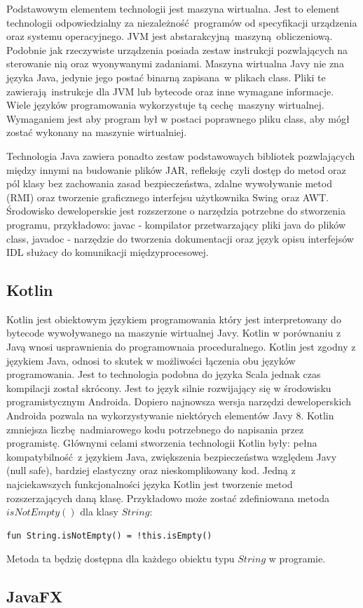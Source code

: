 Podstawowym elementem technologii jest maszyna wirtualna. Jest to element technologii odpowiedzialny za niezależność programów od specyfikacji urządzenia oraz systemu operacyjnego. JVM jest abstarakcyjną maszyną obliczeniową. Podobnie jak rzeczywiste urządzenia posiada zestaw instrukcji pozwlających na sterowanie nią oraz wyonywanymi zadaniami. Maszyna wirtualna Javy nie zna języka Java, jedynie jego postać binarną zapisana w plikach class. Pliki te zawierają instrukcje dla JVM lub bytecode oraz inne wymagane informacje. Wiele języków programowania wykorzystuje tą cechę maszyny wirtualnej. Wymaganiem jest aby program był w postaci poprawnego pliku class, aby mógł zostać wykonany na maszynie wirtualniej.

Technologia Java zawiera ponadto zestaw podstawowaych bibliotek pozwlających między innymi na budowanie plików JAR, refleksję czyli dostęp do metod oraz pól klasy bez zachowania zasad bezpieczeństwa, zdalne wywoływanie metod (RMI) oraz tworzenie graficznego interfejsu użytkownika Swing oraz AWT. Środowisko deweloperskie jest rozszerzone o narzędzia potrzebne do stworzenia programu, przykładowo: javac - kompilator przetwarzający pliki java do plików class, javadoc - narzędzie do tworzenia dokumentacji oraz język opisu interfejsów IDL służacy do komunikacji międzyprocesowej.
\subsection{Kotlin}
Kotlin jest obiektowym językiem programowania który jest interpretowany do bytecode wywoływanego na maszynie wirtualnej Javy. Kotlin w porównaniu z Javą wnosi usprawnienia do programownaia proceduralnego. Kotlin jest zgodny z językiem Java, odnosi to skutek w możliwości łączenia obu języków programowania. Jest to technologia podobna do języka Scala jednak czas kompilacji został skrócony. Jest to język silnie rozwijający się w środowisku programistycznym Androida. Dopiero najnowsza wersja narzędzi deweloperskich Androida pozwala na wykorzystywanie niektórych elementów Javy 8. Kotlin zmniejsza liczbę nadmiarowego kodu potrzebnego do napisania przez programistę. Głównymi celami stworzenia technologii Kotlin były: pełna kompatybilność z językiem Java, zwiększenia bezpieczeństwa względem Javy (null safe), bardziej elastyczny oraz nieskomplikowany kod. Jedną z najciekawszych funkcjonalności języka Kotlin jest tworzenie metod rozszerzających daną klasę. Przykładowo może zostać zdefiniowana metoda $isNotEmpty()$ dla klasy $String$:
\lstset{language=Java}
\begin{lstlisting}[frame=single]
  fun String.isNotEmpty() = !this.isEmpty()
\end{lstlisting}
Metoda ta będzię dostępna dla każdego obiektu typu $String$ w programie.
\subsection{JavaFX}
